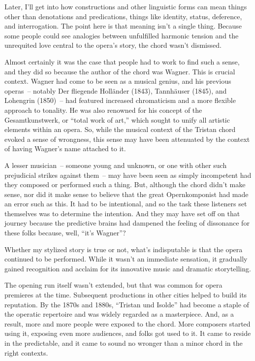 Later, I'll get into how constructions and other linguistic forms can
mean things other than denotations and predications, things like
identity, status, deference, and interrogation. The point here is that
meaning isn't a single thing. Because some people could see analogies
between unfulfilled harmonic tension and the unrequited love central to
the opera's story, the chord wasn't dismissed.

Almost certainly it was the case that people had to work to find such a sense, and they did so because the author of the chord was Wagner. This is crucial context. Wagner had come to be seen as a musical genius, and his previous operas~-- notably Der fliegende Holländer (1843), Tannhäuser (1845), and Lohengrin (1850)~-- had featured increased chromaticism and a more flexible approach to tonality. He was also renowned for his concept of the Gesamtkunstwerk, or ``total work of art,'' which sought to unify all artistic elements within an opera. So, while the musical context of the Tristan chord evoked a sense of wrongness, this sense may have been attenuated by the context of having Wagner's name attached to it.

A lesser musician~-- someone young and unknown, or one with other such prejudicial strikes against them~-- may have been seen as simply incompetent had they composed or performed such a thing. But, although the chord didn't make sense, nor did it make sense to believe that the great Opernkomponist had made an error such as this. It had to be intentional, and so the task these listeners set themselves was to determine the intention. And they may have set off on that journey because the predictive brains had dampened the feeling of dissonance for these folks because, well, ``it's Wagner''?

Whether my stylized story is true or not, what's indisputable is that the opera continued to be performed. While it wasn't an immediate sensation, it gradually gained recognition and acclaim for its innovative music and dramatic storytelling.

The opening run itself wasn't extended, but that was common for opera premieres at the time. Subsequent productions in other cities helped to build its reputation. By the 1870s and 1880s, ``Tristan und Isolde'' had become a staple of the operatic repertoire and was widely regarded as a masterpiece. And, as a result, more and more people were exposed to the chord. More composers started using it, exposing even more audiences, and folks got used to it. It came to reside in the predictable, and it came to sound no wronger than a minor chord in the right contexts.

